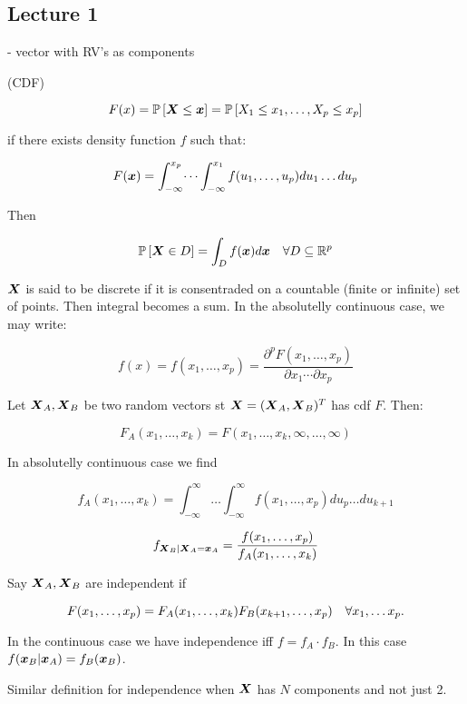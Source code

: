 
\subsection*{Lecture 1}

 - vector with RV's as components


 (CDF)

$$
    F(x)=\mathbb{P}\left[\boldsymbol{X}\leq \boldsymbol{x}\right] = \mathbb{P}\left[X_1\leq x_1,\dots,X_p\leq x_p\right]
$$

 if there exists density function $f$ such that:

$$
    F(\boldsymbol{x})=\int_{-\infty}^{x_p}\dots\int_{-\infty}^{x_1} f(u_1,\dots,u_p) du_1\dots du_p
$$

Then 

$$
    \mathbb{P}\left[\boldsymbol{X}\in D\right] = \int_D f(\boldsymbol{x}) d\boldsymbol{x} \quad\forall D\subseteq \mathbb{R}^p
$$

$\boldsymbol{X}$ is said to be discrete if it is consentraded on a countable (finite or infinite) set of points. Then integral becomes a sum. In the absolutelly continuous case, we may write:

$$
    f(x)=f\left(x_1, \ldots, x_p\right)=\frac{\partial^p F\left(x_1, \ldots, x_p\right)}{\partial x_1 \cdots \partial x_p}
$$

\textbf{} 

Let $\boldsymbol{X}_A, \boldsymbol{X}_B$ be two random vectors st $\boldsymbol{X}=(\boldsymbol{X}_A,\boldsymbol{X}_B)^T$ has cdf $F$. Then:

$$
    F_A(x_1,\dots,x_k) = F(x_1,\dots,x_k,\infty,\dots,\infty)
$$

In absolutelly continuous case we find

$$
    f_A(x_1,\dots,x_k) = \int_{-\infty}^{\infty}\dots\int_{-\infty}^{\infty} f(x_1,\dots,x_p) du_p\dots du_{k+1}
$$

\textbf{} 

$$
    f_{\boldsymbol{X}_B|\boldsymbol{X}_A=\boldsymbol{x}_A} = \frac{f(x_1,\dots,x_p)}{f_A(x_1,\dots,x_k)}
$$

\textbf{} 

Say $\boldsymbol{X}_A, \boldsymbol{X}_B$ are independent if 

$$
    F(x_1,\dots,x_p)=F_A(x_1,\dots,x_k)F_B(x_{k+1},\dots,x_p) \quad\forall x_1,\dots x_p.
$$

In the continuous case we have independence iff $f=f_A\cdot f_B$. In this case $f(\boldsymbol{x}_B|\boldsymbol{x}_A) = f_B(\boldsymbol{x}_B)$.

Similar definition for independence when $\boldsymbol{X}$ has $N$ components and not just 2.

